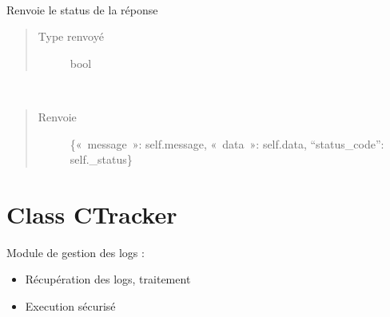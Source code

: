 \documentclass[letterpaper,10pt,french]{sphinxmanual}
\begin{document}
\begin{fulllineitems}
\label{\detokenize{classes/cfgloader:toolbox.logmng.CReponder}}~

\begin{fulllineitems}
\label{\detokenize{classes/cfgloader:toolbox.logmng.CReponder.ok}}
Renvoie le status de la réponse
\begin{quote}\begin{description}
\item[{Type renvoyé}] \leavevmode
bool

\end{description}\end{quote}

\end{fulllineitems}


\begin{fulllineitems}
\label{\detokenize{classes/cfgloader:toolbox.logmng.CReponder.response}}~\begin{quote}\begin{description}
\item[{Renvoie}] \leavevmode
\{« message »: self.message, « data »: self.data, “status\_code”: self.\_status\}

\end{description}\end{quote}

\end{fulllineitems}


\end{fulllineitems}



\section{Class CTracker}
\label{\detokenize{classes/cfgloader:class-ctracker}}
Module de gestion des logs :
\begin{itemize}
\item {} 
Récupération des logs, traitement

\item {} 
Execution sécurisé

\end{itemize}
\end{document}

